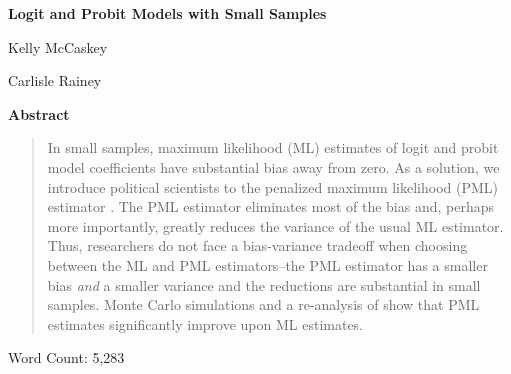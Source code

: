 \documentclass[12pt]{article}
\begin{document}
\begin{center}
{\LARGE{\textbf{Logit and Probit Models with Small Samples}}}\\\vspace{2mm}

\vspace{10mm}

Kelly McCaskey

\vspace{3mm}

Carlisle Rainey
\end{center}

\vspace{10mm}

{\centerline{\textbf{Abstract}}}
\begin{quote}\noindent
In small samples, maximum likelihood (ML) estimates of logit and probit model coefficients have substantial bias away from zero.
As a solution, we introduce political scientists to the penalized maximum likelihood (PML) estimator \citep{Firth1993}.
The PML estimator eliminates most of the bias and, perhaps more importantly, greatly reduces the variance of the usual ML estimator.
Thus, researchers do not face a bias-variance tradeoff when choosing between the ML and PML estimators--the PML estimator has a smaller bias \textit{and} a smaller variance and the reductions are substantial in small samples.
Monte Carlo simulations and a re-analysis of \cite{GeorgeEpstein1992} show that PML estimates significantly improve upon ML estimates.
 \end{quote}

 \vspace{5mm}
 \begin{center}
 Word Count: 5,283
 \end{center}
\end{document}
